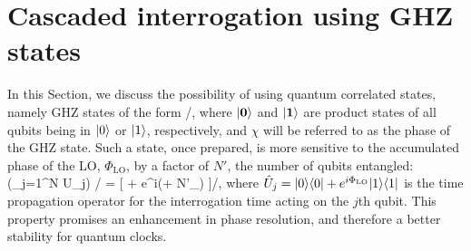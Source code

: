 \section{Cascaded interrogation using GHZ states}
In this Section, we discuss the possibility of using quantum correlated
states, namely GHZ states of the form
/,
\eel
where $| \mathbf{0} \rangle$ and $| \mathbf{1} \rangle$ are product states of all qubits
being in $| 0 \rangle$ or $| 1 \rangle$, respectively, and $\chi$ will be referred to as
the phase of the GHZ state. Such a state, once prepared, is more sensitive to
the accumulated phase of the LO, $\Phi_\mathrm{LO}$, by a factor of $N'$, the
number of qubits entangled:
\bel
	\left(\prod_{j=1}^N \hat U_j\right) / 
	= [ + e^{i(\chi + N'\Phi_)}
	]/,
\eel
where $\hat U_j = | 0 \rangle\langle 0 | + e^{i\Phi_\mathrm{LO}}| 1 \rangle\langle 1 |$ is the
time propagation operator for the interrogation time acting on the $j$th qubit. This property promises an
enhancement in phase resolution, and therefore a better stability for quantum clocks.

